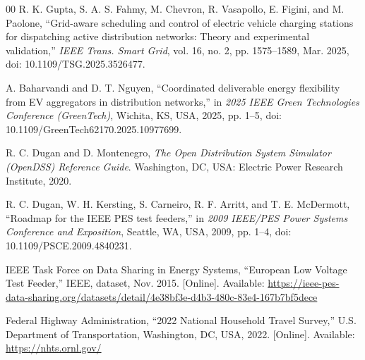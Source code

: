 \begin{thebibliography}{00}
 R. K. Gupta, S. A. S. Fahmy, M. Chevron, R. Vasapollo, E. Figini, and M. Paolone, ``Grid-aware scheduling and control of electric vehicle charging stations for dispatching active distribution networks: Theory and experimental validation,'' \emph{IEEE Trans. Smart Grid}, vol. 16, no. 2, pp. 1575--1589, Mar. 2025, doi: 10.1109/TSG.2025.3526477.

 A. Baharvandi and D. T. Nguyen, ``Coordinated deliverable energy flexibility from EV aggregators in distribution networks,'' in \emph{2025 IEEE Green Technologies Conference (GreenTech)}, Wichita, KS, USA, 2025, pp. 1--5, doi: 10.1109/GreenTech62170.2025.10977699.

 R. C. Dugan and D. Montenegro, \emph{The Open Distribution System Simulator (OpenDSS) Reference Guide}. Washington, DC, USA: Electric Power Research Institute, 2020.

 R. C. Dugan, W. H. Kersting, S. Carneiro, R. F. Arritt, and T. E. McDermott, ``Roadmap for the IEEE PES test feeders,'' in \emph{2009 IEEE/PES Power Systems Conference and Exposition}, Seattle, WA, USA, 2009, pp. 1--4, doi: 10.1109/PSCE.2009.4840231.

 IEEE Task Force on Data Sharing in Energy Systems, ``European Low Voltage Test Feeder,'' IEEE, dataset, Nov. 2015. [Online]. Available: \url{https://ieee-pes-data-sharing.org/datasets/detail/4e38bf3e-d4b3-480c-83e4-167b7bf5dece}

 Federal Highway Administration, ``2022 National Household Travel Survey,'' U.S. Department of Transportation, Washington, DC, USA, 2022. [Online]. Available: \url{https://nhts.ornl.gov/}
\end{thebibliography}

